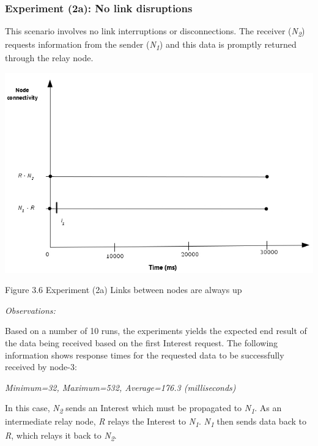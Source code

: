 \documentclass[a4paper,12pt]{report}      %
\begin{document}
\subsubsection{Experiment (2a): No link disruptions}

This scenario involves no link interruptions or disconnections. The receiver (\emph{N\textsubscript{2}}) requests information from
the sender (\emph{N\textsubscript{1}}) and this data is promptly returned through the relay node.

\noindent\includegraphics[scale=0.55]{exp2a_timediag.jpg}\newline
\begin{center}Figure 3.6 Experiment (2a) Links between nodes are always up\end{center}

\vspace*{1\baselineskip}\noindent\emph{Observations:}

Based on a number of 10 runs, the experiments yields the expected end result of the data being received
based on the first Interest request. The following information shows response times for the requested
data to be successfully received by node-3:

\begin{center}\textsl{Minimum=32, Maximum=532, Average=176.3 (milliseconds)}\end{center}

In this case,  \emph{N\textsubscript{2}} sends an Interest which must be propagated to  \emph{N\textsubscript{1}}. As an intermediate relay
node,  \emph{R} relays the Interest to  \emph{N\textsubscript{1}}. \emph{N\textsubscript{1}} then sends data back to  \emph{R}, which relays it back to  \emph{N\textsubscript{2}}.
\end{document}
